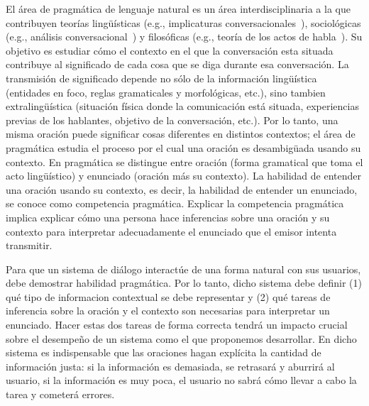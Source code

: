 \documentclass[11pt]{article}
\begin{document}
El \'area de pragm\'atica de lenguaje natural es un \'area
interdisciplinaria a
la que contribuyen teor\'ias ling\"u\'isticas (e.g., implicaturas
conversacionales~\citep{grice75}), sociol\'ogicas (e.g., an\'alisis
conversa\-cio\-nal~\citep{schegloff87b}) y filos\'oficas (e.g., teor\'ia de los
actos de habla~\citep{austin62}). Su objetivo es estudiar c\'omo el contexto en
el que la conversaci\'on esta situada contribuye al significado de cada cosa
que se diga durante esa conversaci\'on. La transmisi\'on de significado depende
no s\'olo de la informaci\'on ling\"u\'istica (entidades en foco, reglas
gramaticales y morfol\'ogicas, etc.), sino tambien extraling\"u\'istica
(situaci\'on f\'isica donde la comunicaci\'on est\'a situada, experiencias
previas de los hablantes, objetivo de la conversaci\'on, etc.). Por lo tanto,
una misma oraci\'on puede significar cosas diferentes en distintos contextos; el
\'area de pragm\'atica estudia el proceso por el cual una oraci\'on es
desambig\"uada usando su contexto. En pragm\'atica se distingue entre oraci\'on
(forma gramatical que toma el acto ling\"u\'istico) y enunciado (oraci\'on m\'as
su contexto). La habilidad de entender una oraci\'on usando su contexto, es
decir, la habilidad de entender un enunciado, se conoce como competencia
pragm\'atica.
Explicar la competencia pragm\'atica implica explicar c\'omo una persona hace
inferencias sobre una oraci\'on y su contexto para interpretar adecuadamente el
enunciado que el emisor intenta transmitir. 

Para que un sistema de di\'alogo interact\'ue de una forma natural con sus
usuarios, debe demostrar habilidad pragm\'atica. Por lo tanto, dicho sistema
debe definir (1) qu\'e tipo de informacion contextual se debe representar y (2)
qu\'e tareas de inferencia sobre la oraci\'on y el contexto son necesarias para
interpretar un enunciado. Hacer estas dos tareas de forma correcta tendr\'a un
impacto crucial sobre el desempe\~no de un sistema como el que proponemos
desarrollar. En dicho sistema es indispensable que las oraciones hagan
expl\'icita la cantidad de informaci\'on justa: si la informaci\'on es
demasiada, se retrasar\'a y aburrir\'a al usuario, si la informaci\'on es muy
poca, el usuario no sabr\'a c\'omo llevar a cabo la tarea y cometer\'a errores. 
\end{document}
